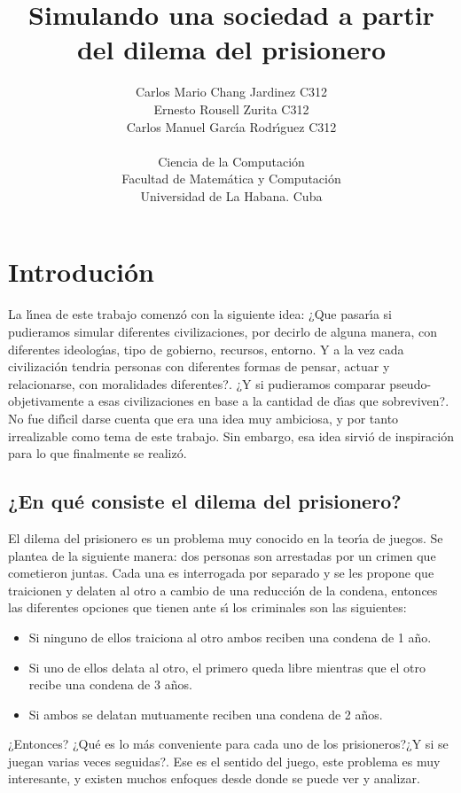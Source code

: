 \documentclass{article}
\title{Simulando una sociedad a partir del dilema del prisionero}
\author{Carlos Mario Chang Jardinez C312\\Ernesto Rousell Zurita C312\\Carlos Manuel Garc\'{\i}a Rodr\'{\i}guez C312\\\\	
\small{\sc Ciencia de la Computaci\'on}\\
\small{\sc Facultad de Matem\'atica y Computaci\'on}\\
\small{\sc Universidad de La Habana. Cuba}
}
\begin{document}
\maketitle
\newpage
\tableofcontents
\newpage

\section{Introduci\'on}
La l\'{\i}nea de este trabajo comenz\'o con la siguiente idea: ¿Que pasar\'{\i}a si pudieramos simular diferentes civilizaciones, por
decirlo de alguna manera, con diferentes ideolog\'{\i}as, tipo de gobierno, recursos, entorno. Y a la vez cada civilizaci\'on tendria
personas con diferentes formas de pensar, actuar y relacionarse, con moralidades diferentes?. ¿Y si pudieramos comparar pseudo-objetivamente
a esas civilizaciones en base a la cantidad de d\'{\i}as que sobreviven?. No fue dif\'{\i}cil darse cuenta que era una idea muy ambiciosa, y por
tanto irrealizable como tema de este trabajo. Sin embargo, esa idea sirvi\'o de inspiraci\'on para lo que finalmente se realiz\'o.

\subsection*{¿En qu\'e consiste el dilema del prisionero?}
El dilema del prisionero es un problema muy conocido en la teor\'{\i}a de juegos. Se plantea de la siguiente manera: dos personas son arrestadas por
un crimen que cometieron juntas. Cada una es interrogada por separado y se les propone que traicionen y delaten al otro a cambio de una reducci\'on de
la condena, entonces las diferentes opciones que tienen ante s\'{\i} los criminales son las siguientes:

\begin{itemize}
      \item Si ninguno de ellos traiciona al otro ambos reciben una condena de 1 a\~no.
      \item Si uno de ellos delata al otro, el primero queda libre mientras que el otro recibe una condena de 3 a\~nos.
      \item Si ambos se delatan mutuamente reciben una condena de 2 a\~nos.
\end{itemize}
¿Entonces? ¿Qu\'e es lo m\'as conveniente para cada uno de los prisioneros?¿Y si se juegan varias veces seguidas?. Ese es el sentido del juego, este
problema es muy interesante, y existen muchos enfoques desde donde se puede ver y analizar.
\end{document}
